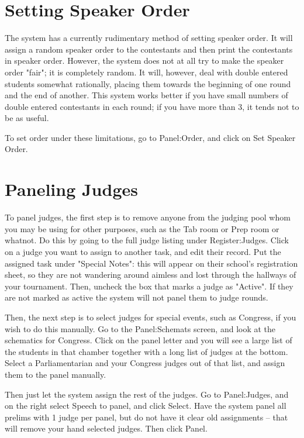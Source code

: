 \documentclass[12pt]{report} \usepackage {fullpage} \usepackage{times}
\begin{document}
\section{Setting Speaker Order}

The system has a currently rudimentary method of setting speaker order.
It will assign a random speaker order to the contestants and then print the
contestants in speaker order.   However, the system does not at all try to
make the speaker order "fair"; it is completely random.   It will, however,
deal with double entered students somewhat rationally, placing them towards
the beginning of one round and the end of another.    This system works
better if you have small numbers of double entered contestants in each
round; if you have more than 3, it tends not to be as useful.

To set order under these limitations, go to Panel:Order, and click on Set
Speaker Order.
 	
\section{Paneling Judges}

To panel judges, the first step is to remove anyone from the judging pool
whom you may be using for other purposes, such as the Tab room or Prep room
or whatnot.   Do this by going to the full judge listing under
Register:Judges.    Click on a judge you want to assign to another task,
and edit their record.  Put the assigned task under "Special Notes":  this
will appear on their school's registration sheet, so they are not wandering
around aimless and lost through the hallways of your tournament.  Then,
uncheck the box that marks a judge as "Active".  If they are not marked as
active the system will not panel them to judge rounds.  

Then, the next step is to select judges for special events, such as
Congress, if you wish to do this manually.   Go to the Panel:Schemats
screen, and look at the schematics for Congress.   Click on the panel
letter and you will see a large list of the students in that chamber
together with a long list of judges at the bottom.  Select a
Parliamentarian and your Congress judges out of that list, and assign them
to the panel manually.   

Then just let the system assign the rest of the judges.  Go to
Panel:Judges, and on the right select Speech to panel, and click Select.
Have the system panel all prelims with 1 judge per panel, but do not have
it clear old assignments -- that will remove your hand selected judges.
Then click Panel. 
\end{document}
